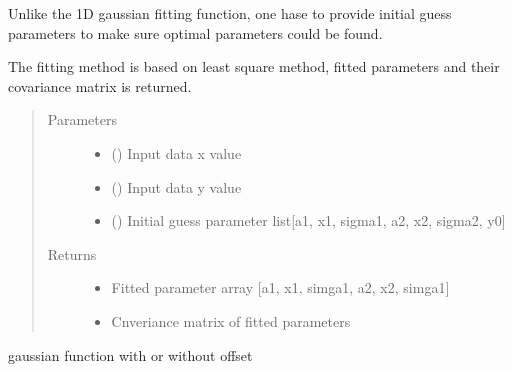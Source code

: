 \documentclass[letterpaper,10pt,english]{sphinxmanual}
\begin{document}
\begin{fulllineitems}
\begin{fulllineitems}
Unlike the 1D gaussian fitting function, one hase to provide
initial guess parameters to make sure optimal parameters could
be found.

The fitting method is based on  least square method, fitted
parameters and their covariance matrix is returned.
\begin{quote}\begin{description}
\item[{Parameters}] \leavevmode\begin{itemize}
\item {} 
 () \textendash{} Input data x value

\item {} 
 () \textendash{} Input data y value

\item {} 
 () \textendash{} Initial guess parameter list{[}a1, x1, sigma1, a2, x2, sigma2, y0{]}

\end{itemize}

\item[{Returns}] \leavevmode
\begin{itemize}
\item {} 
 \textendash{} Fitted parameter array {[}a1, x1, simga1, a2, x2, simga1{]}

\item {} 
 \textendash{} Cnveriance matrix of fitted parameters

\end{itemize}


\end{description}\end{quote}

\end{fulllineitems}


\begin{fulllineitems}
\label{\detokenize{scibeam.core:scibeam.core.gaussian.Gaussian.gaus}}
gaussian function with or without offset


\end{fulllineitems}
\end{fulllineitems}
\end{document}
